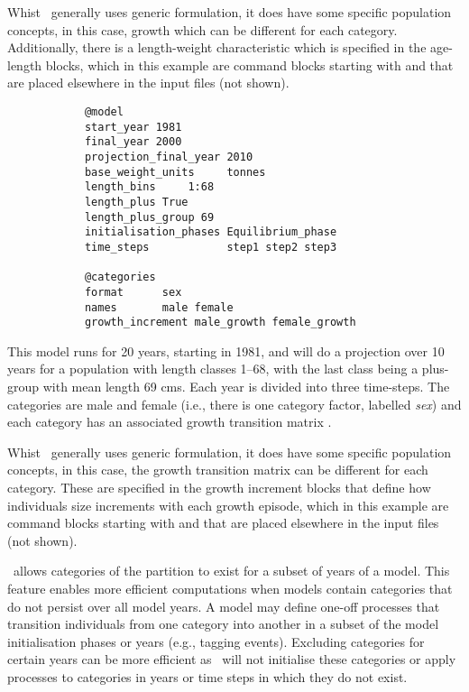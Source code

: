 Whist \CNAME\ generally uses generic formulation, it does have some specific population concepts, in this case, growth which can be different for each category. Additionally, there is a length-weight characteristic which is specified in the age-length blocks, which in this example are command blocks starting with  and  that are placed elsewhere in the input files (not shown).

\else
{\small{\begin{verbatim}
			@model
			start_year 1981
			final_year 2000
			projection_final_year 2010
			base_weight_units     tonnes
			length_bins	    1:68
			length_plus True
			length_plus_group 69
			initialisation_phases Equilibrium_phase
			time_steps            step1 step2 step3
			
			@categories
			format      sex
			names       male female
			growth_increment male_growth female_growth
\end{verbatim}}}

This model runs for 20 years, starting in 1981, and will do a projection over 10 years for a population with length classes 1--68, with the last class being a plus-group with mean length 69 cms. Each year is divided into three time-steps. The categories are male and female (i.e., there is one category factor, labelled \textit{sex}) and each category has an associated growth transition matrix .

Whist \CNAME\ generally uses generic formulation, it does have some specific population concepts, in this case, the growth transition matrix can be different for each category. These are specified in the growth increment blocks that define how individuals size increments with each growth episode, which in this example are command blocks starting with  and  that are placed elsewhere in the input files (not shown).
\fi

\CNAME\ allows categories of the partition to exist for a subset of years of a model. This feature enables more efficient computations when models contain categories that do not persist over all model years. A model may define one-off processes that transition individuals from one category into another in a subset of the model initialisation phases or years (e.g., tagging events). Excluding categories for certain years can be more efficient as \CNAME\ will not initialise these categories or apply processes to categories in years or time steps in which they do not exist.

